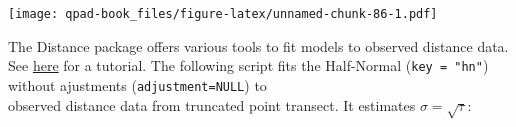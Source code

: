 \documentclass[12pt,]{book}
\newenvironment{Shaded}{\begin{snugshade}}{\end{snugshade}}
\newcommand{\DataTypeTok}[1]{\textcolor[rgb]{0.13,0.29,0.53}{#1}}
\newcommand{\DecValTok}[1]{\textcolor[rgb]{0.00,0.00,0.81}{#1}}
\newcommand{\KeywordTok}[1]{\textcolor[rgb]{0.13,0.29,0.53}{\textbf{#1}}}
\newcommand{\NormalTok}[1]{#1}
\newcommand{\OperatorTok}[1]{\textcolor[rgb]{0.81,0.36,0.00}{\textbf{#1}}}
\newcommand{\OtherTok}[1]{\textcolor[rgb]{0.56,0.35,0.01}{#1}}
\newcommand{\StringTok}[1]{\textcolor[rgb]{0.31,0.60,0.02}{#1}}
\begin{document}
\begin{Shaded}
\end{Shaded}

\texttt{[image: qpad-book\_files/figure-latex/unnamed-chunk-86-1.pdf]}

The Distance package offers various tools to fit
models to observed distance data.
See \href{https://workshops.distancesampling.org/duke-spatial-2015/practicals/1-detection-functions-solutions.html}{here} for a tutorial.
The following script fits the Half-Normal (\texttt{key\ =\ "hn"})
without ajustments (\texttt{adjustment=NULL}) to\\
observed distance data from truncated point transect.
It estimates \(\sigma = \sqrt{\tau}\):
\end{document}
